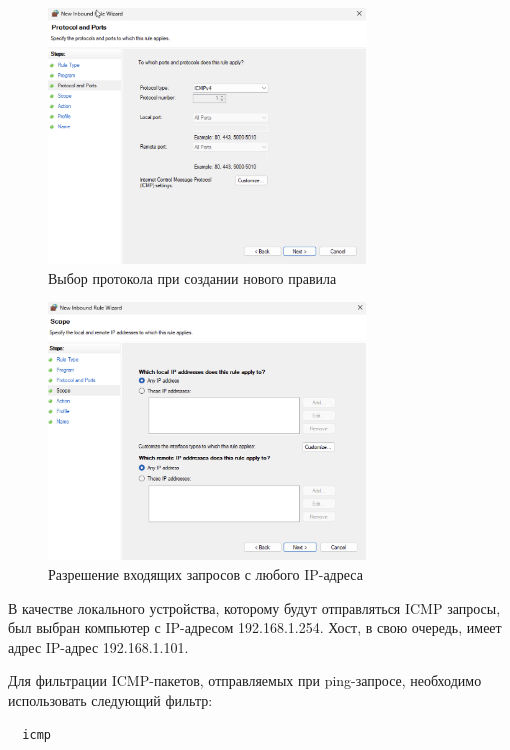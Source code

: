 \documentclass[a4paper, 14pt]{extarticle}
\begin{document}
\begin{figure}[H]
  \centering
  \includegraphics[width=0.75\textwidth]{images/firewall-icmp-2.png}
  \caption{Выбор протокола при создании нового правила}
  \label{fig:firewall-icmp-2}
\end{figure}

\begin{figure}[H]
  \centering
  \includegraphics[width=0.75\textwidth]{images/firewall-icmp-3.png}
  \caption{Разрешение входящих запросов с любого IP-адреса}
  \label{fig:firewall-icmp-3}
\end{figure}

В качестве локального устройства, которому будут отправляться ICMP запросы, был
выбран компьютер с IP-адресом 192.168.1.254. Хост, в свою очередь, имеет адрес
IP-адрес 192.168.1.101.

Для фильтрации ICMP-пакетов, отправляемых при ping-запросе, необходимо
использовать следующий фильтр:
\begin{verbatim}
  icmp
\end{verbatim}
\end{document}
